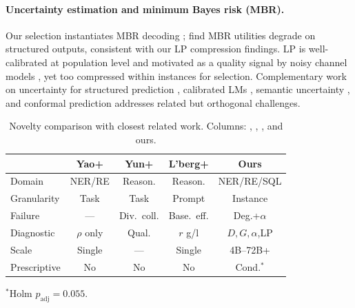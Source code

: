 \paragraph{Uncertainty estimation and minimum Bayes risk (MBR).}
Our selection instantiates MBR decoding \cite{eikema2022sampling}; \citet{eikema2025structured} find MBR utilities degrade on structured outputs, consistent with our LP compression findings.
LP is well-calibrated at population level \cite{kadavath2022language, tian2023calibration} and motivated as a quality signal by noisy channel models \cite{yee2019noisy}, yet too compressed within instances for selection.
Complementary work on uncertainty for structured prediction \cite{malinin2021uncertainty}, calibrated LMs \cite{desai2020calibration}, semantic uncertainty \cite{kuhn2023semantic}, and conformal prediction \cite{angelopoulos2023conformal} addresses related but orthogonal challenges.

\begin{table}[t]
\centering
\footnotesize
\setlength{\tabcolsep}{3pt}
\caption{Novelty comparison with closest related work. Columns: \citet{yao2026consistency}, \citet{yun2025price}, \citet{landesberg2026bon}, and ours.}
\label{tab:novelty_comparison}
\begin{tabular}{@{}lcccc@{}}
\toprule
& Yao+ & Yun+ & L'berg+ & Ours \\
\midrule
Domain & NER/RE & Reason. & Reason. & NER/RE/SQL \\
Granularity & Task & Task & Prompt & Instance \\
Failure & --- & Div.\ coll. & Base.\ eff. & Deg.+$\alpha$ \\
Diagnostic & $\rho$ only & Qual. & $r$ g/l & $D,G,\alpha$,LP \\
Scale & Single & --- & Single & 4B--72B+ \\
Prescriptive & No & No & No & Cond.$^*$ \\
\bottomrule
\end{tabular}

\vspace{3pt}
{\scriptsize $^*$Holm $p_{\text{adj}}{=}0.055$.}
\vspace{-20pt}
\end{table}
\vspace{-8pt}

